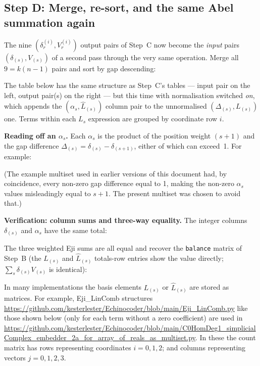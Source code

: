 \documentclass[11pt,a4paper]{article}
\newcommand{\eji}[2]{e^{#1}_{#2}}       %
\begin{document}
\subsection*{Step D: Merge, re-sort, and the same Abel summation again}

The nine $(\delta^{(i)}_r, V^{(i)}_r)$ output pairs of Step~C now become the
\emph{input} pairs $(\delta_{(s)}, V_{(s)})$ of a second pass through the very
same operation.  Merge all $9 = k(n{-}1)$ pairs and sort by gap descending:

The table below has the same structure as Step~C's tables — input pair on the
left, output pair(s) on the right — but this time with normalisation switched
\emph{on}, which appends the $(\alpha_s, \hat{L}_{(s)})$ column pair to the
unnormalised $(\Delta_{(s)}, L_{(s)})$ one.  Terms within each $L_s$
expression are grouped by coordinate row $i$.




\begin{tcolorbox}[notebox]
\textbf{Reading off an $\alpha_s$.}  Each $\alpha_s$ is the product of the
position weight $(s{+}1)$ and the gap difference
$\Delta_{(s)} = \delta_{(s)}-\delta_{(s+1)}$, either of which can exceed~1.
For example:

(The example multiset used in earlier versions of this document had, by
coincidence, every non-zero gap difference equal to 1, making the non-zero
$\alpha_s$ values misleadingly equal to $s{+}1$.  The present multiset was
chosen to avoid that.)
\end{tcolorbox}

\begin{tcolorbox}[notebox]
\textbf{Verification: column sums and three-way equality.}
The integer columns $\delta_{(s)}$ and $\alpha_s$ have the same total:

The three weighted Eji sums are all equal and recover the
\texttt{balance} matrix of Step~B (the $L_{(s)}$ and ${\hat L}_{(s)}$ totals-row
entries show the value directly; $\sum_s\delta_{(s)}V_{(s)}$ is identical):

\end{tcolorbox}

In many implementations the basis elements $L_{(s)}$ or ${\hat L}_{(s)}$ are stored as matrices.   For example, Eji\_LinComb
structures \url{https://github.com/kesterlester/Echinocoder/blob/main/Eji_LinComb.py} like those shown
below (only for each term without a zero coefficient) are used in
\url{https://github.com/kesterlester/Echinocoder/blob/main/C0HomDeg1_simplicialComplex_embedder_2a_for_array_of_reals_as_multiset.py}.
In these the count matrix has rows representing
coordinates $i{=}0,1,2$; and columns representing vectors $j{=}0,1,2,3$.

\end{document}
